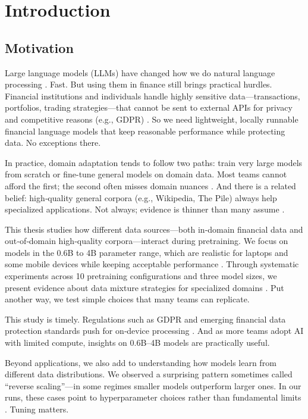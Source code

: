 \chapter{Introduction}

\section{Motivation}

Large language models (LLMs) have changed how we do natural language processing \parencite{vaswani2017attention,radford2019language,brown2020language,touvron2023llama}. Fast. But using them in finance still brings practical hurdles. Financial institutions and individuals handle highly sensitive data—transactions, portfolios, trading strategies—that cannot be sent to external APIs for privacy and competitive reasons (e.g., GDPR) \parencite{eu2016gdpr}. So we need lightweight, locally runnable financial language models that keep reasonable performance while protecting data. No exceptions there.

In practice, domain adaptation tends to follow two paths: train very large models from scratch or fine-tune general models on domain data. Most teams cannot afford the first; the second often misses domain nuances \parencite{gururangan2020don}. And there is a related belief: high‑quality general corpora (e.g., Wikipedia, The Pile) always help specialized applications. Not always; evidence is thinner than many assume \parencite{gao2020pile,raffel2020exploring,longpre2023pretrainer}.

This thesis studies how different data sources—both in‑domain financial data and out‑of‑domain high‑quality corpora—interact during pretraining. We focus on models in the 0.6B to 4B parameter range, which are realistic for laptops and some mobile devices while keeping acceptable performance \parencite{yang2024qwen2,xia2023sheared,team2024gemma,javaheripi2023phi}. Through systematic experiments across 10 pretraining configurations and three model sizes, we present evidence about data mixture strategies for specialized domains \parencite{wu2023bloomberggpt}. Put another way, we test simple choices that many teams can replicate.

This study is timely. Regulations such as GDPR and emerging financial data protection standards push for on‑device processing \parencite{eu2016gdpr}. And as more teams adopt AI with limited compute, insights on 0.6B–4B models are practically useful.

Beyond applications, we also add to understanding how models learn from different data distributions. We observed a surprising pattern sometimes called ``reverse scaling''—in some regimes smaller models outperform larger ones. In our runs, these cases point to hyperparameter choices rather than fundamental limits \parencite{kaplan2020scaling,hoffmann2022training,mccandlish2018empirical}. Tuning matters.

